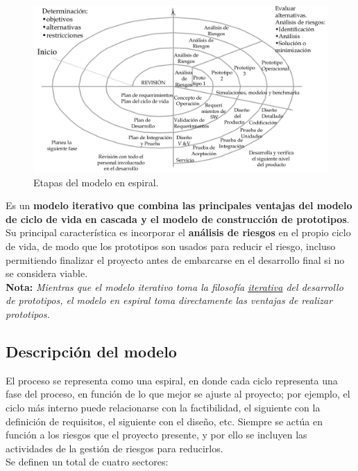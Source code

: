 \begin{figure}[H]
   \centering
   \includegraphics[width=0.9\linewidth]{Resources/Tema3/modeloEspiral.png}
   \caption{Etapas del modelo en espiral.}
   \label{fig:modeloEspiral}
\end{figure}

Es un \textbf{modelo iterativo que combina las principales ventajas del modelo de ciclo de vida en cascada y el modelo de construcción de prototipos}. Su principal característica es incorporar el \textbf{análisis de riesgos} en el propio ciclo de vida, de modo que los prototipos son usados para reducir el riesgo, incluso permitiendo finalizar el proyecto antes de embarcarse en el desarrollo final si no se considera viable.\\

\textbf{Nota:} \textit{Mientras que el modelo iterativo toma la filosofía \uline{iterativa} del desarrollo de prototipos, el modelo en espiral toma directamente las ventajas de realizar prototipos.}


\subsection{Descripción del modelo}

El proceso se representa como una espiral, en donde cada ciclo representa una fase del proceso, en función de lo que mejor se ajuste al proyecto; por ejemplo, el ciclo más interno puede relacionarse con la factibilidad, el siguiente con la definición de requisitos, el siguiente con el diseño, etc. Siempre se actúa en función a los riesgos que el proyecto presente, y por ello se incluyen las actividades de la gestión de riesgos para reducirlos.\\

Se definen un total de cuatro sectores:

